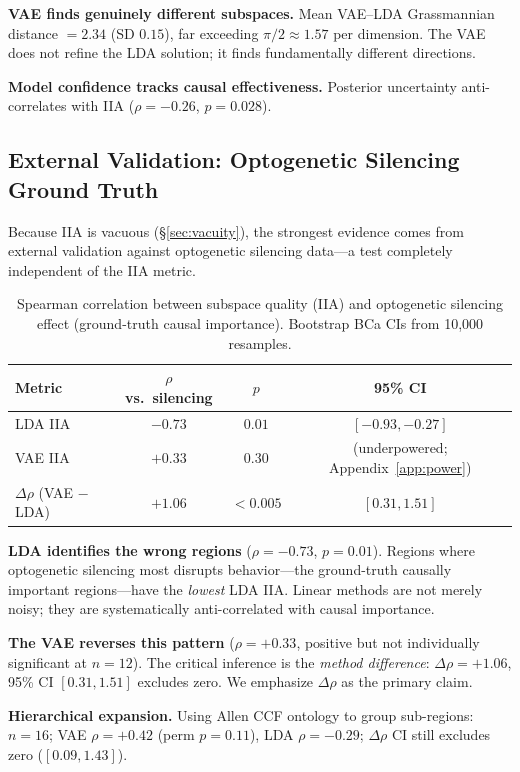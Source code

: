 \documentclass{article}
\begin{document}
\textbf{VAE finds genuinely different subspaces.} Mean VAE--LDA Grassmannian distance $= 2.34$ (SD $0.15$), far exceeding $\pi/2 \approx 1.57$ per dimension. The VAE does not refine the LDA solution; it finds fundamentally different directions.

\textbf{Model confidence tracks causal effectiveness.} Posterior uncertainty anti-correlates with IIA ($\rho = -0.26$, $p = 0.028$).


\subsection{External Validation: Optogenetic Silencing Ground Truth}
\label{sec:silencing}

Because IIA is vacuous (\S\ref{sec:vacuity}), the strongest evidence comes from external validation against optogenetic silencing data---a test completely independent of the IIA metric.

\begin{table}[h]
\centering
\small
\caption{Spearman correlation between subspace quality (IIA) and optogenetic silencing effect (ground-truth causal importance). Bootstrap BCa CIs from 10,000 resamples.}
\label{tab:silencing}
\begin{tabular}{lccc}
\toprule
Metric & $\rho$ vs.\ silencing & $p$ & 95\% CI \\
\midrule
LDA IIA & $-0.73$ & $0.01$ & $[-0.93, -0.27]$ \\
VAE IIA & $+0.33$ & $0.30$ & (underpowered; Appendix~\ref{app:power}) \\
$\Delta\rho$ (VAE $-$ LDA) & $+1.06$ & $< 0.005$ & $[0.31, 1.51]$ \\
\bottomrule
\end{tabular}
\end{table}

\textbf{LDA identifies the wrong regions} ($\rho = -0.73$, $p = 0.01$). Regions where optogenetic silencing most disrupts behavior---the ground-truth causally important regions---have the \emph{lowest} LDA IIA. Linear methods are not merely noisy; they are systematically anti-correlated with causal importance.

\textbf{The VAE reverses this pattern} ($\rho = +0.33$, positive but not individually significant at $n = 12$). The critical inference is the \emph{method difference}: $\Delta\rho = +1.06$, 95\% CI $[0.31, 1.51]$ excludes zero. We emphasize $\Delta\rho$ as the primary claim.

\textbf{Hierarchical expansion.} Using Allen CCF ontology to group sub-regions: $n = 16$; VAE $\rho = +0.42$ (perm $p = 0.11$), LDA $\rho = -0.29$; $\Delta\rho$ CI still excludes zero ($[0.09, 1.43]$).
\end{document}
